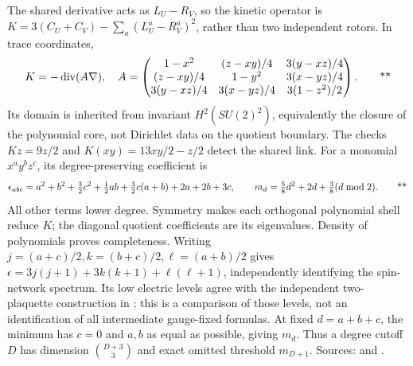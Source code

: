 The shared derivative acts as \(L_U-R_V\), so the kinetic operator is
\(K=3(C_U+C_V)-\sum_a(L_U^a-R_V^a)^2\), rather than two independent rotors.
In trace coordinates,
\begin{equation}
 K=-\operatorname{div}(A\nabla),\quad
 A=\begin{pmatrix}
 1-x^2&(z-xy)/4&3(y-xz)/4\\
 (z-xy)/4&1-y^2&3(x-yz)/4\\
 3(y-xz)/4&3(x-yz)/4&3(1-z^2)/2
 \end{pmatrix}.
 \qquad\text{**}\label{early:operator}
\end{equation}
Its domain is inherited from invariant \(H^2(SU(2)^2)\), equivalently the
closure of the polynomial core, not Dirichlet data on the quotient boundary.
The checks \(Kz=9z/2\) and \(K(xy)=13xy/2-z/2\) detect the shared link.
For a monomial \(x^ay^bz^c\), its degree-preserving coefficient is
\begin{equation}
 \epsilon_{abc}=a^2+b^2+\tfrac32c^2+\tfrac12ab+
 \tfrac32c(a+b)+2a+2b+3c,
 \qquad m_d=\tfrac58d^2+2d+\tfrac38(d\bmod2).
 \qquad\text{**}\label{early:shell}
\end{equation}
All other terms lower degree.  Symmetry makes each orthogonal polynomial
shell reduce \(K\); the diagonal quotient coefficients are its eigenvalues.
Density of polynomials proves completeness.  Writing
\(j=(a+c)/2,k=(b+c)/2,\ell=(a+b)/2\) gives
\(\epsilon=3j(j+1)+3k(k+1)+\ell(\ell+1)\), independently identifying the
spin-network spectrum.  Its low electric levels agree with the independent
two-plaquette construction in \cite{froland2025two}; this is a comparison of
those levels, not an identification of all intermediate gauge-fixed formulas.
At fixed \(d=a+b+c\), the minimum has \(c=0\) and
\(a,b\) as equal as possible, giving \(m_d\).  Thus a degree cutoff \(D\)
has dimension \(\binom{D+3}{3}\) and exact omitted threshold \(m_{D+1}\).
Sources:  and
.

